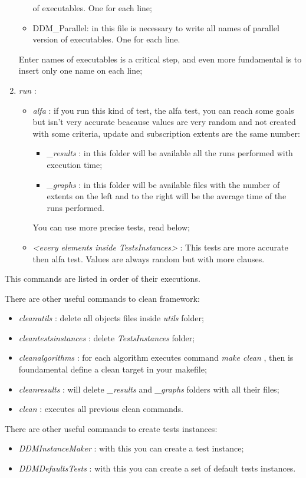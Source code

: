 \documentclass[a4paper,11pt]{report}
\newcommand{\folder}[1]{
  \textcolor{foldercolor}{\textit{#1}}
}
\newcommand{\command}[1]{
  \textcolor{commandcolor}{\textit{#1}}
}
\begin{document}
\begin{enumerate}
\begin{itemize}
   of executables. One for each line;
   \item DDM\_Parallel: in this file is necessary to write all names of parallel version of
   executables. One for each line.
  \end{itemize}
  Enter names of executables is a critical step, and even more fundamental is to insert only 
  one name on each line;
  \item \command{run}:
    \begin{itemize}
     \item \command{alfa}: if you run this kind of test, the alfa test, you can reach some
      goals but isn't very accurate beacause values are very random and not created with some
      criteria, update and subscription extents are the same number:
      \begin{itemize}
       \item \folder{\_results}: in this folder will be available all the runs performed with 
       execution time;
       \item \folder{\_graphs}: in this folder will be available files with the number 
       of extents on the left and to the right will be the average time of the runs performed.
      \end{itemize}
      You can use more precise tests, read below;
     \item \command{<every elements inside TestsInstances>}: This tests are more accurate then
     alfa test. Values are always random but with more clauses.
    \end{itemize}
 \end{enumerate}
 This commands are listed in order of their executions.
 
 There are other useful commands to clean framework:
 \begin{itemize}
  \item \command{cleanutils}: delete all objects files inside \folder{utils} folder;
  \item \command{cleantestsinstances}: delete \folder{TestsInstances} folder;
  \item \command{cleanalgorithms}: for each algorithm executes command \command{make clean}, 
  then is foundamental define a clean target in your makefile;
  \item \command{cleanresults}: will delete \folder{\_results} and \folder{\_graphs} folders 
  with all their files;
  \item \command{clean}: executes all previous clean commands.
 \end{itemize}
 
 There are other useful commands to create tests instances:
 \begin{itemize}
  \item \command{DDMInstanceMaker}: with this you can create a test instance;
  \item \command{DDMDefaultsTests}: with this you can create a set of default tests instances.
 \end{itemize}

 
\end{document}
